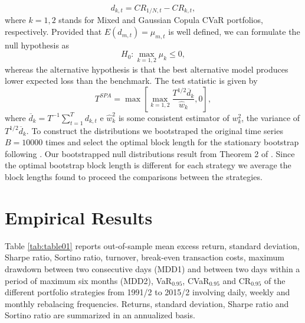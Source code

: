 \documentclass[a4paper,10pt]{article}
\begin{document}
\[
d_{k,t}=CR_{1/N,t}-CR_{k,t},
\]%
where $k = 1, 2$ stands for Mixed and Gaussian Copula CVaR portfolios, respectively. Provided that $E\left( d_{m,t}\right) =\mu _{m,t}$ is well defined, we can formulate the null hypothesis as 
\[
H_{0}:\underset{k=1,2}{\max }\mu _{k}\leq 0,
\]
whereas the alternative hypothesis is that the best alternative model produces lower expected loss than the benchmark. The test statistic is given by 
\[
T^{SPA}=\max \left[\underset{k=1,2}{\max } \frac{T^{1/2}\overline{d}%
	_{k}}{\widehat{w}_{k}},0\right] ,
\]%
where $\overline{d}_{k}=T^{-1}\sum_{t=1}^{T}d_{k,t}$ e $\widehat{w}%
_{k}^{2}$ is some consistent estimator of $w_{k}^{2}$, the variance of $%
T^{1/2}\overline{d}_{k}$. To construct the distributions we bootstraped the original time
series $B=10000$ times and select the optimal block length for the
stationary bootstrap following \citet*{pw04}. Our bootstrapped null
distributions result from Theorem 2 of \citet*{pr94}. Since the optimal
bootstrap block length is different for each strategy we average the block
lengths found to proceed the comparisons between the strategies.



\vspace{0.3cm}

\section{Empirical Results}

Table \ref{tab:table01} reports out-of-sample mean
excess return, standard deviation, Sharpe ratio, Sortino ratio, turnover,
break-even transaction costs, maximum drawdown between two consecutive days
(MDD1) and between two days within a period of maximum six months (MDD2), VaR$_{0.95}$,
CVaR$_{0.95}$ and CR$_{0.95}$ of the different portfolio strategies from 1991/2 to 2015/2
involving daily, weekly and monthly rebalacing frequencies. Returns,
standard deviation, Sharpe ratio and Sortino ratio are summarized in an
annualized basis.
\end{document}
